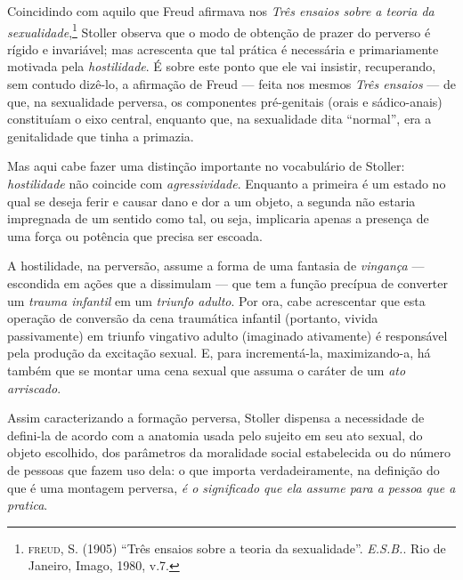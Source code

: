 Coincidindo com aquilo que Freud afirmava nos \textit{Três ensaios sobre a
teoria da sexualidade},\footnote{ \textsc{freud}, S. (1905) “Três ensaios sobre a
teoria da sexualidade”. \textit{E.S.B.}. Rio de Janeiro, Imago, 1980,
v.7.} Stoller observa que o modo de obtenção de prazer do perverso é
rígido e invariável; mas acrescenta que tal prática é necessária e
primariamente motivada pela \textit{hostilidade}. É sobre este ponto que
ele vai insistir, recuperando, sem contudo dizê-lo, a afirmação de Freud ---
feita nos mesmos \textit{Três ensaios} --- de que, na sexualidade perversa,
os componentes pré-genitais (orais e sádico-anais) constituíam o eixo
central, enquanto que, na sexualidade dita “normal”, era a genitalidade que
tinha a primazia.

Mas aqui cabe fazer uma distinção importante no vocabulário de Stoller:
\textit{hostilidade} não coincide com \textit{agressividade}. Enquanto a
primeira é um estado no qual se deseja ferir e causar dano e dor a um
objeto, a segunda não estaria impregnada de um sentido como tal, ou seja,
implicaria apenas a presença de uma força ou potência que precisa ser
escoada.

A hostilidade, na perversão, assume a forma de uma fantasia de
\textit{vingança} --- escondida em ações que a dissimulam --- que tem a função
precípua de converter um \textit{trauma infantil} em um \textit{triunfo
adulto}. Por ora, cabe acrescentar que esta operação de conversão da cena
traumática infantil (portanto, vivida passivamente) em triunfo vingativo
adulto (imaginado ativamente) é responsável pela produção da excitação
sexual. E, para incrementá-la, maximizando-a, há também que se montar uma
cena sexual que assuma o caráter de um \textit{ato arriscado}.

Assim caracterizando a formação perversa, Stoller dispensa a necessidade de
defini-la de acordo com a anatomia usada pelo sujeito em seu ato sexual, do
objeto escolhido, dos parâmetros da moralidade social estabelecida ou do
número de pessoas que fazem uso dela: o que importa verdadeiramente, na
definição do que é uma montagem perversa, \textit{é o significado que ela
assume para a pessoa que a pratica}.

